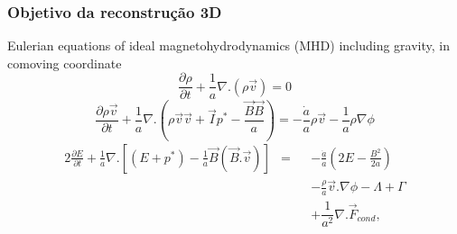 \begin{frame}
  \frametitle{Objetivo da reconstrução 3D}

\begin{alertblock}{Eulerian equations of ideal magnetohydrodynamics (MHD)
including    gravity, in comoving coordinate}
\[ \frac{\partial \rho }{\partial t} + \frac{1}{a}\nabla .(\rho \vec{v}) =
    0
\]
\[ \frac{\partial \rho \vec{v}}{\partial t} + \dfrac{1}{a}\nabla
    .\left(\rho \vec{v}\vec{v} + \vec{I}p^* - \frac{\vec{B}\vec{B}}{a}\right) =
    -\frac{\dot{a}}{a}\rho \vec{v} - \frac{1}{a}\rho \nabla \phi
\]
    \begin{alignat*}{2}
      \frac {\partial E} {\partial t} + \frac {1}{a} \nabla . \left[ (E+p^*) -
        \frac{1}{a}\vec{B}(\vec{B}.\vec{v})\right] &= &&-
      \frac{\dot{a}}{a}\left(2E - \frac{B^2}{2a}\right) \\
      & &&  - \frac{\rho}{a}\vec{v}.\nabla \phi
      - \Lambda + \Gamma\\
      & && + \dfrac{1}{a^2}\nabla . \vec{F}_{cond},
    \end{alignat*}

\end{alertblock}

\end{frame}

